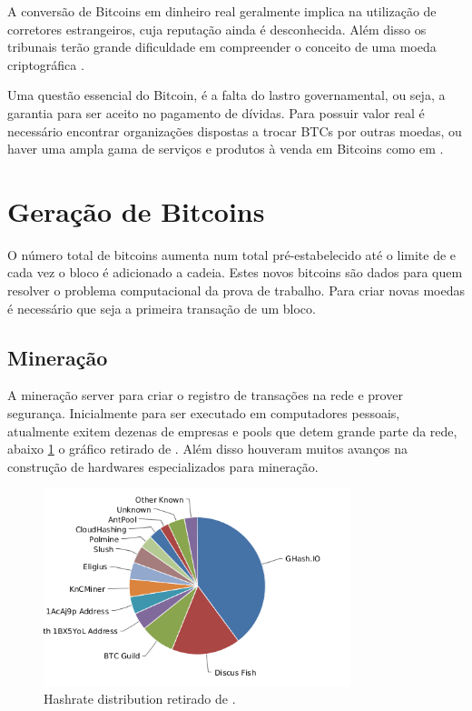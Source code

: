 \documentclass[a4paper,11pt]{article}
\theoremstyle{mytheor}
\begin{document}
A conversão de Bitcoins em dinheiro real geralmente implica na utilização de corretores estrangeiros, cuja reputação ainda é desconhecida. Além disso os tribunais terão grande dificuldade em compreender o conceito de uma moeda criptográfica \cite{pascale}.

Uma questão essencial do Bitcoin, é a falta do lastro governamental, ou seja, a garantia para ser aceito no pagamento de dívidas. Para possuir valor real é necessário encontrar organizações dispostas a trocar BTCs por outras moedas, ou haver uma ampla gama de serviços e produtos à venda em Bitcoins como em \cite{trade}.

\section{Geração de Bitcoins}
O número total de bitcoins aumenta num total pré-estabelecido até o limite de e cada vez o bloco é adicionado a cadeia. Estes novos bitcoins são dados para quem resolver o problema computacional da prova de trabalho. Para criar novas moedas é necessário que seja a primeira transação de um bloco.
\subsection*{Mineração}
A mineração server para criar o registro de transações na rede e prover segurança. Inicialmente para ser executado em computadores pessoais, atualmente exitem dezenas de empresas e pools que detem grande parte da rede, abaixo \ref{pools} o gráfico retirado de \cite{pools}. Além disso houveram muitos avanços na construção de hardwares especializados para mineração.

\begin{figure}[H]
   \label{pools}
   \centering
   \includegraphics[width=0.8\textwidth]{images/pools.png}
   \caption{Hashrate distribution retirado de \cite{pools}.}
\end{figure}
\end{document}
